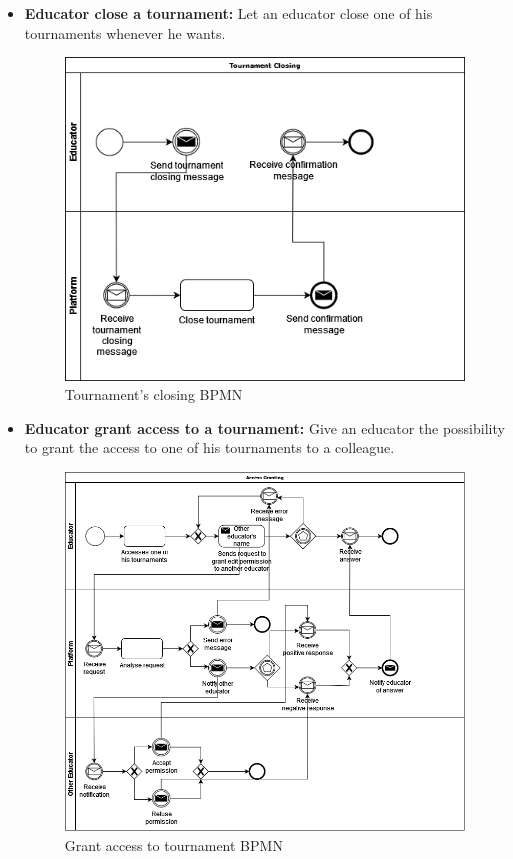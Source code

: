 \documentclass{article}
\begin{document}
{\begin{itemize}
            \item \textbf{Educator close a tournament:} Let an educator close one of his tournaments whenever he wants.
            \begin{figure}[H]
                \centering
                \includegraphics[scale=0.4]{images/BPMN/TournamentClosing.png}
                \caption{Tournament's closing BPMN}
                \label{fig:TournamentClosingBPMN}
            \end{figure}

            \item \textbf{Educator grant access to a tournament:} Give an educator the possibility to grant the access to one of his tournaments to a colleague.
            \begin{figure}[H]
                \centering
                \includegraphics[scale=0.4]{images/BPMN/GrantAccess.png}
                \caption{Grant access to tournament BPMN}
                \label{fig:accessGrantTournamentBPMN}
            \end{figure}


\end{itemize}}
\end{document}
